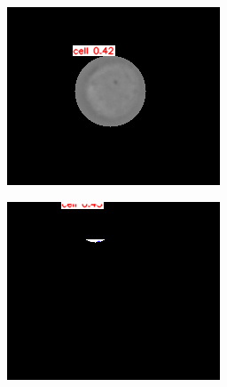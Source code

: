 \begin{figure}[h]
\begin{center}
\begin{subfigure}[b]{0.25\textwidth}
			\label{fig:cellnet}
		\end{subfigure}
		\begin{subfigure}[b]{0.25\textwidth}
		    \centering
			\includegraphics[width=\textwidth]{thesis-template-master/images/gbciou8.png}
			\caption{}
			\label{fig:cellnet}
		\end{subfigure}
		\begin{subfigure}[b]{0.25\textwidth}
		    \centering
			\includegraphics[width=\textwidth]{thesis-template-master/images/gbciou9.png}
			\caption{}
			\label{fig:cellnet}

\end{subfigure}
\end{center}
\end{figure}

